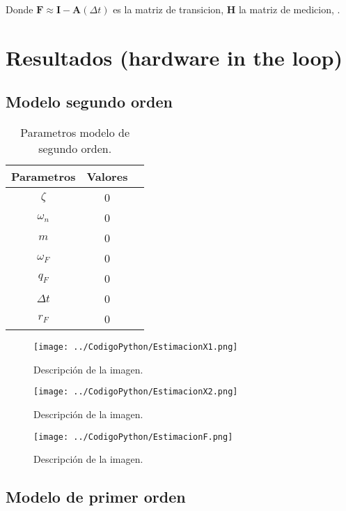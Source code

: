 \documentclass[conference]{IEEEtran}
\begin{document}
Donde $\mathbf{F}\approx \mathbf{I} - \mathbf{A}(\Delta t) $ es la matriz de transicion, $\mathbf{H}$  la matriz de medicion, .


\section{Resultados (hardware in the loop)}

\subsection{Modelo segundo orden}

\begin{table}[h]
	\centering
	\caption{Parametros modelo de segundo orden.}
	\label{tab:parametros_segundo_orden}
	\begin{tabular}{|c|c|c|}
		\hline
		\textbf{Parametros} & \textbf{Valores} \\
		\hline
		$\zeta$  &  0 \\
		$\omega_n$      & 0 \\
		$m$ & 0 \\
		$\omega_F$ & 0 \\
		$ q_F $  &  0\\
		$\Delta t$ & 0\\  
		$r_F$ & 0 \\ 
		\hline
	\end{tabular}
	
\end{table}




\begin{figure}[h]
	\centering
	\texttt{[image: ../CodigoPython/EstimacionX1.png]}
	\caption{Descripción de la imagen.}
	\label{fig:etiqueta}
\end{figure}

\begin{figure}[h]
	\centering
	\texttt{[image: ../CodigoPython/EstimacionX2.png]}
	\caption{Descripción de la imagen.}
	\label{fig:etiqueta}
\end{figure}

\begin{figure}[h]
	\centering
	\texttt{[image: ../CodigoPython/EstimacionF.png]}
	\caption{Descripción de la imagen.}
	\label{fig:etiqueta}
\end{figure}


\subsection{Modelo de primer orden}
\end{document}
